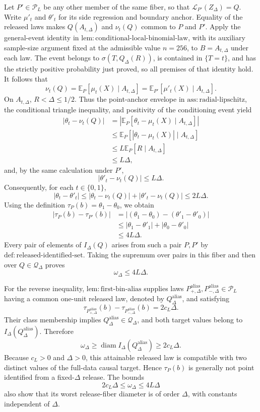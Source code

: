 Let \(P'\in\mathcal P_L\) be any other member of the same fiber, so that \(\mathcal L_{P'}(Z_\Delta)=Q\).  Write \(\mu'_t\) and \(\theta'_t\) for its side regression and boundary anchor.  Equality of the released laws makes \(Q(A_{t,\Delta})\) and \(\nu_t(Q)\) common to \(P\) and \(P'\).  Apply the general-event identity in \(\mathrm{lem:conditional\text{-}local\text{-}binomial\text{-}law}\), with its auxiliary sample-size argument fixed at the admissible value \(n=256\), to \(B=A_{t,\Delta}\) under each law.  The event belongs to \(\sigma(T,Q_\Delta(R))\), is contained in \(\{T=t\}\), and has the strictly positive probability just proved, so all premises of that identity hold.  It follows that
\[
 \nu_t(Q)
 =\mathbb E_P[\mu_t(X)\mid A_{t,\Delta}]
 =\mathbb E_{P'}[\mu'_t(X)\mid A_{t,\Delta}].
\]
On \(A_{t,\Delta}\), \(R<\Delta\leq1/2\).  Thus the point-anchor envelope in \(\mathrm{ass:radial\text{-}lipschitz}\), the conditional triangle inequality, and positivity of the conditioning event yield
\[
 \begin{aligned}
 |\theta_t-\nu_t(Q)|
 &=\left|\mathbb E_P[\theta_t-\mu_t(X)\mid A_{t,\Delta}]\right|\\
 &\leq\mathbb E_P[|\theta_t-\mu_t(X)|\mid A_{t,\Delta}]\\
 &\leq L\mathbb E_P[R\mid A_{t,\Delta}]\\
 &\leq L\Delta,
 \end{aligned}
\]
and, by the same calculation under \(P'\),
\[
 |\theta'_t-\nu_t(Q)|\leq L\Delta.
\]
Consequently, for each \(t\in\{0,1\}\),
\[
 |\theta_t-\theta'_t|
 \leq|\theta_t-\nu_t(Q)|+|\theta'_t-\nu_t(Q)|
 \leq2L\Delta.
\]
Using the definition \(\tau_P(b)=\theta_1-\theta_0\), we obtain
\[
 \begin{aligned}
 |\tau_P(b)-\tau_{P'}(b)|
 &=| (\theta_1-\theta_0)-(\theta'_1-\theta'_0)|\\
 &\leq|\theta_1-\theta'_1|+|\theta_0-\theta'_0|\\
 &\leq4L\Delta.
 \end{aligned}
\]
Every pair of elements of \(I_\Delta(Q)\) arises from such a pair \(P,P'\) by \(\mathrm{def:released\text{-}identified\text{-}set}\).  Taking the supremum over pairs in this fiber and then over \(Q\in\mathcal Q_\Delta\) proves
\[
 \omega_\Delta\leq4L\Delta.
\]

For the reverse inequality, \(\mathrm{lem:first\text{-}bin\text{-}alias}\) supplies laws \(P^{\mathrm{alias}}_{+,\Delta},P^{\mathrm{alias}}_{-,\Delta}\in\mathcal P_L\) having a common one-unit released law, denoted by \(Q^{\mathrm{alias}}_\Delta\), and satisfying
\[
 \tau_{P^{\mathrm{alias}}_{+,\Delta}}(b)
 -\tau_{P^{\mathrm{alias}}_{-,\Delta}}(b)
 =2c_L\Delta.
\]
Their class membership implies \(Q^{\mathrm{alias}}_\Delta\in\mathcal Q_\Delta\), and both target values belong to \(I_\Delta(Q^{\mathrm{alias}}_\Delta)\).  Therefore
\[
 \omega_\Delta
 \geq\operatorname{diam}I_\Delta(Q^{\mathrm{alias}}_\Delta)
 \geq2c_L\Delta.
\]
Because \(c_L>0\) and \(\Delta>0\), this attainable released law is compatible with two distinct values of the full-data causal target.  Hence \(\tau_P(b)\) is generally not point identified from a fixed-\(\Delta\) release.  The bounds
\[
 2c_L\Delta\leq\omega_\Delta\leq4L\Delta
\]
also show that its worst release-fiber diameter is of order \(\Delta\), with constants independent of \(\Delta\).